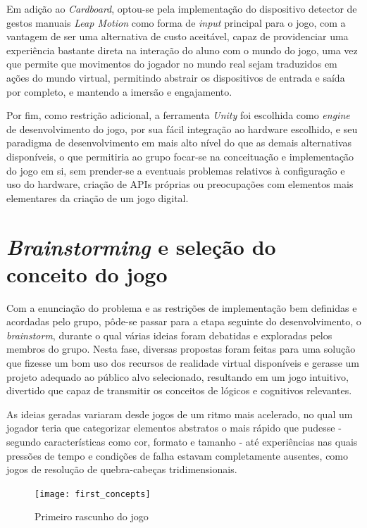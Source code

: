 Em adição ao \textit{Cardboard}, optou-se pela implementação do dispositivo detector de gestos manuais \textit{Leap Motion} como forma de \textit{input} principal para o jogo, com a vantagem de ser uma alternativa de custo aceitável, capaz de providenciar uma experiência bastante direta na interação do aluno com o mundo do jogo, uma vez que permite que movimentos do jogador no mundo real sejam traduzidos em ações do mundo virtual, permitindo abstrair os dispositivos de entrada e saída por completo, e mantendo a imersão e engajamento.

Por fim, como restrição adicional, a ferramenta \textit{Unity} foi escolhida como \textit{engine} de desenvolvimento do jogo, por sua fácil integração ao hardware escolhido, e seu paradigma de desenvolvimento em mais alto nível do que as demais alternativas disponíveis, o que permitiria ao grupo focar-se na conceituação e implementação do jogo em si, sem prender-se a eventuais problemas relativos à configuração e uso do hardware, criação de APIs próprias ou preocupações com elementos mais elementares da criação de um jogo digital.

\section{\textit{Brainstorming} e seleção do conceito do jogo}\label{sec-brainstorming-conceito}

Com a enunciação do problema e as restrições de implementação bem definidas e acordadas pelo grupo, pôde-se passar para a etapa seguinte do desenvolvimento, o \textit{brainstorm}, durante o qual várias ideias foram debatidas e exploradas pelos membros do grupo. Nesta fase, diversas propostas foram feitas para uma solução que fizesse um bom uso dos recursos de realidade virtual disponíveis e gerasse um projeto adequado ao público alvo selecionado, resultando em um jogo intuitivo, divertido que capaz de transmitir os conceitos de lógicos e cognitivos relevantes.

As ideias geradas variaram desde jogos de um ritmo mais acelerado, no qual um jogador teria que categorizar elementos abstratos o mais rápido que pudesse - segundo características como cor, formato e tamanho - até experiências nas quais pressões de tempo e condições de falha estavam completamente ausentes, como jogos de resolução de quebra-cabeças tridimensionais.

\begin{figure}[h]
	\centering
	\caption{Primeiro rascunho do jogo}
	\texttt{[image: first\_concepts]}
	\legend{\fonteAP}
\end{figure}

